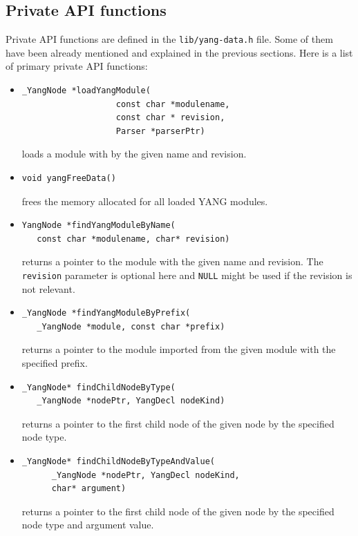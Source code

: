\documentclass[conference]{IEEEtran}
\begin{document}
\subsection{Private API functions}
Private API functions are defined in the \texttt{lib/yang-data.h} file. 
Some of them have been already mentioned and explained in the previous sections. Here is a list of primary private API functions:
\begin{itemize}
\item
\small
\begin{verbatim}
_YangNode *loadYangModule(
                   const char *modulename, 
                   const char * revision, 
                   Parser *parserPtr)
\end{verbatim}
\normalsize

loads a module with by the given name and revision.
\item
\small
\begin{verbatim}
void yangFreeData()
\end{verbatim}
\normalsize
frees the memory allocated for all loaded YANG modules. 

\item
\small
\begin{verbatim}
YangNode *findYangModuleByName(
   const char *modulename, char* revision)
\end{verbatim}
\normalsize
returns a pointer to the module with the given name and revision. 
The \texttt{revision} parameter is optional here and \texttt{NULL} might be used if the revision is not relevant.

\item
\small
\begin{verbatim}
_YangNode *findYangModuleByPrefix(
   _YangNode *module, const char *prefix)
\end{verbatim}
\normalsize
returns a pointer to the module imported from the given module with the specified prefix.

\item
\small
\begin{verbatim}
_YangNode* findChildNodeByType(
   _YangNode *nodePtr, YangDecl nodeKind)
\end{verbatim}
\normalsize
returns a pointer to the first child node of the given node by the specified node type.

\item
\small
\begin{verbatim}
_YangNode* findChildNodeByTypeAndValue(
      _YangNode *nodePtr, YangDecl nodeKind, 
      char* argument)
\end{verbatim}
\normalsize
returns a pointer to the first child node of the given node by the specified node type and argument value.


\end{itemize}
\end{document}
